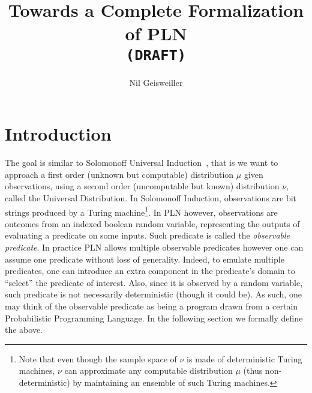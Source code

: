\documentclass[]{article}
\begin{document}
\newcommand{\nuPLN}{\nu\textup{PLN}}
\newcommand{\Bool}{\textup{Bool}}
\newcommand{\T}{\top}
\newcommand{\F}{\bot}
\newcommand{\Domain}{\mathcal{D}}
\newcommand{\Subsetdom}{\mathcal{S}}
\newcommand{\Predicate}{\mathcal{P}}
\newcommand{\Language}{\mathcal{L}}
\newcommand{\Event}{\mathcal{F}}
\newcommand{\Model}{M}
\newcommand{\Datax}{D_x}
\newcommand{\DataxD}{D_{x\in\Domain}}
\newcommand{\DataS}{D_{\Subsetdom}}
\newcommand{\STV}[2]{<\!#1, #2\!>}
\newcommand{\limp}{\Rightarrow}
\newcommand{\Nat}{\mathbb{N}}
\newcommand{\anymu}{\hat{\mu}}
\newcommand{\anyomega}{\hat{\omega}}

\title{Towards a Complete Formalization of PLN\\
  \texttt{(DRAFT)}} \author{Nil Geisweiller}
\maketitle

\section{Introduction}
The goal is similar to Solomonoff Universal Induction~\cite{TODO},
that is we want to approach a first order (unknown but computable)
distribution $\mu$ given observations, using a second order
(uncomputable but known) distribution $\nu$, called the Universal
Distribution.  In Solomonoff Induction, observations are bit strings
produced by a Turing machine\footnote{Note that even though the sample
space of $\nu$ is made of deterministic Turing machines, $\nu$ can
approximate any computable distribution $\mu$ (thus non-deterministic)
by maintaining an ensemble of such Turing machines.}.  In PLN however,
observations are outcomes from an indexed boolean random variable,
representing the outputs of evaluating a predicate on some inputs.
Such predicate is called the \emph{observable predicate}.  In practice
PLN allows multiple observable predicates however one can assume one
predicate without loss of generality.  Indeed, to emulate multiple
predicates, one can introduce an extra component in the predicate's
domain to ``select'' the predicate of interest.  Also, since it is
observed by a random variable, such predicate is not necessarily
deterministic (though it could be).  As such, one may think of the
observable predicate as being a program drawn from a certain
Probabilistic Programming Language.  In the following section we
formally define the above.
\end{document}

